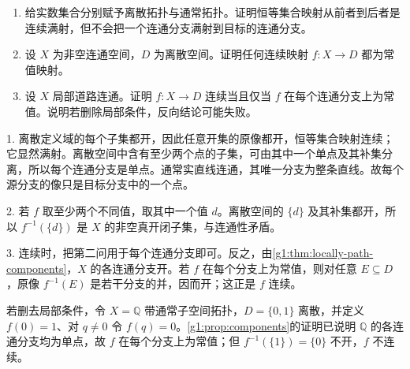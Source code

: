 \begin{exercise}\label{g1:exr:maps-components}
	\begin{enumerate}
		\item 给实数集合分别赋予离散拓扑与通常拓扑。证明恒等集合映射从前者到后者是连续满射，但不会把一个连通分支满射到目标的连通分支。
		\item 设 \(X\) 为非空连通空间，\(D\) 为离散空间。证明任何连续映射 \(f:X\to D\) 都为常值映射。
		\item 设 \(X\) 局部道路连通。证明 \(f:X\to D\) 连续当且仅当 \(f\) 在每个连通分支上为常值。说明若删除局部条件，反向结论可能失败。
	\end{enumerate}
\end{exercise}
\begin{solution}
	1. 离散定义域的每个子集都开，因此任意开集的原像都开，恒等集合映射连续；它显然满射。离散空间中含有至少两个点的子集，可由其中一个单点及其补集分离，所以每个连通分支是单点。通常实直线连通，其唯一分支为整条直线。故每个源分支的像只是目标分支中的一个点。

	2. 若 \(f\) 取至少两个不同值，取其中一个值 \(d\)。离散空间的 \(\{d\}\) 及其补集都开，所以 \(f^{-1}(\{d\})\) 是 \(X\) 的非空真开闭子集，与连通性矛盾。

	3. 连续时，把第二问用于每个连通分支即可。反之，由\cref{g1:thm:locally-path-components}，\(X\) 的各连通分支开。若 \(f\) 在每个分支上为常值，则对任意 \(E\subseteq D\)，原像 \(f^{-1}(E)\) 是若干分支的并，因而开；这正是 \(f\) 连续。

	若删去局部条件，令 \(X=\mathbb Q\) 带通常子空间拓扑，\(D=\{0,1\}\) 离散，并定义 \(f(0)=1\)、对 \(q\ne0\) 令 \(f(q)=0\)。\cref{g1:prop:components}的证明已说明 \(\mathbb Q\) 的各连通分支均为单点，故 \(f\) 在每个分支上为常值；但 \(f^{-1}(\{1\})=\{0\}\) 不开，\(f\) 不连续。
\end{solution}


